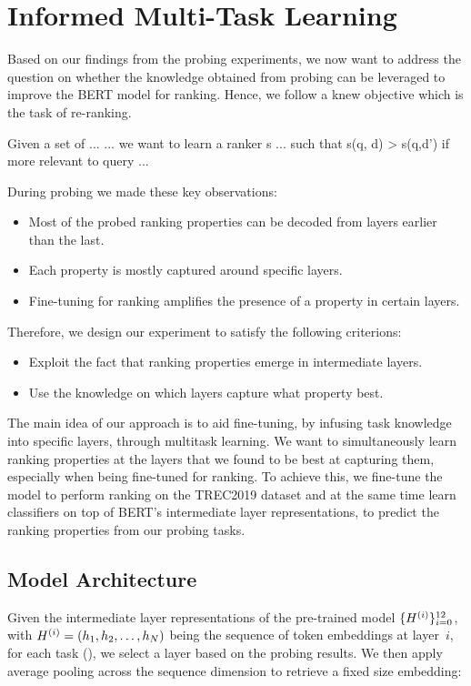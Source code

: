\chapter{Informed Multi-Task Learning}
Based on our findings from the probing experiments, we now want to address the question on whether the knowledge obtained from probing can be leveraged to improve the BERT model for ranking. Hence, we follow a knew objective which is the task of re-ranking.

Given a set of ... ... we want to learn a ranker s ... such that s(q, d) > s(q,d') if more relevant to query ...

During probing we made these key observations:

\begin{itemize}
    \item Most of the probed ranking properties can be decoded from layers earlier than the last.
    \item Each property is mostly captured around specific layers.
    \item Fine-tuning for ranking amplifies the presence of a property in certain layers.
\end{itemize}

Therefore, we design our experiment to satisfy the following criterions:
\begin{itemize}
    \item Exploit the fact that ranking properties emerge in intermediate layers.
    \item Use the knowledge on which layers capture what property best.
\end{itemize}



The main idea of our approach is to aid fine-tuning, by infusing task knowledge into specific layers, through multitask learning. We want to simultaneously learn ranking properties at the layers that we found to be best at capturing them, especially when being fine-tuned for ranking.
To achieve this, we fine-tune the  model to perform ranking on the TREC2019 dataset and at the same time learn classifiers on top of BERT's intermediate layer representations, to predict the ranking properties from our probing tasks.

\section{Model Architecture}
Given the intermediate layer representations of the pre-trained  model $\{H^{(i)}\}_{i=0}^{12}$, with $H^{(i)} = (h_1, h_2, \dots, h_{N})$ being the sequence of token embeddings at layer~$i$, for each task (), we select a layer based on the probing results. We then apply average pooling across the sequence dimension to retrieve a fixed size embedding:

